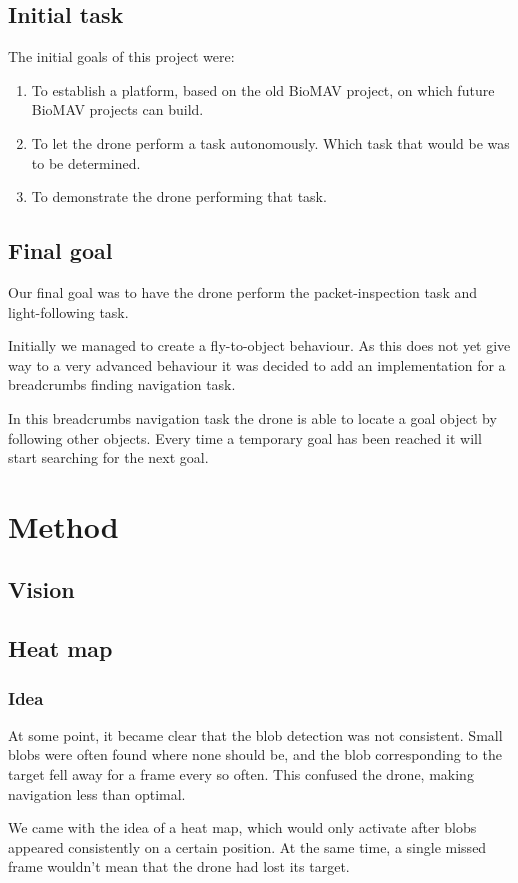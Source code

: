 \documentclass[a4paper,10pt]{article}
\begin{document}
\subsection{Initial task}
\label{sec:initialtask}
The initial goals of this project were:
\begin{enumerate}
\item To establish a platform, based on the old BioMAV project, on which
      future BioMAV projects can build.
\item To let the drone perform a task autonomously. Which task that would be
      was to be determined.
\item To demonstrate the drone performing that task.
\end{enumerate}
\subsection{Final goal}
\label{sec:finalgoal}
Our final goal was to have the drone perform the packet-inspection task and
light-following task.

Initially we managed to create a fly-to-object behaviour. As this does not yet give way to a very advanced behaviour it was decided to add an implementation for a breadcrumbs finding navigation task. 

In this breadcrumbs navigation task the drone is able to locate a goal object by following other objects. 
Every time a temporary goal has been reached it will start searching for the next goal. 
\section{Method}
\subsection{Vision}
\subsection{Heat map}
\subsubsection{Idea}
At some point, it became clear that the blob detection was not consistent.
Small blobs were often found where none should be, and the blob corresponding
to the target fell away for a frame every so often. This confused the drone,
making navigation less than optimal.

We came with the idea of a heat map, which
would only activate after blobs appeared consistently on a certain position.
At the same time, a single missed frame wouldn't mean that the drone had lost
its target.
\end{document}
